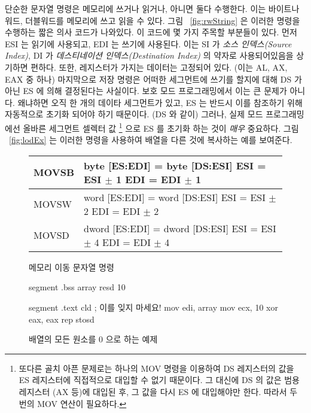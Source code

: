 단순한 문자열 명령은 메모리에 쓰거나 읽거나, 아니면 둘다 수행한다. 이는 
바이트나 워드, 더블워드를 메모리에 쓰고 읽을 수 있다. 그림
~\ref{fig:rwString} 은 이러한 명령을 수행하는 짧은 의사 코드가 나와있다. 
이 코드에 몇 가지 주목할 부분들이 있다. 먼저 ESI 는 읽기에 사용되고, EDI 는
쓰기에 사용된다. 이는 SI 가 \emph{소스 인덱스(Source Index)}, DI 가 \emph{
데스티네이션 인덱스(Destination Index)} 의 약자로 사용되어있음을 상기하면 편하다. 
  또한, 레지스터가 가지는 데이터는
고정되어 있다. (이는 AL, AX, EAX 중 하나) 마지막으로 저장 명령은 어떠한 세그먼트에
쓰기를 할지에 대해 DS 가 아닌 ES 에 의해 결정된다는 사실이다. 보호 모드 프로그래밍에서
이는 큰 문제가 아니다. 왜냐하면 오직 한 개의 데이타 세그먼트가 있고, ES 는 반드시 
이를 참조하기 위해 자동적으로 초기화 되어야 하기 때문이다. (DS 와 같이) 그러나, 
실제 모드 프로그래밍에선 올바른 세그먼트 셀렉터 값
\footnote{또다른 골치 아픈 문제로는 하나의 {\code MOV} 명령을 이용하여
DS 레지스터의 값을 ES 레지스터에 직접적으로 대입할 수 없기 때문이다. 그 대신에
DS 의 값은 범용 레지스터 (AX 등)에 대입된 후, 그 값을 다시 ES 에 대입해야만
한다. 따라서 두 번의 {\code MOV} 연산이 필요하다. }
으로 ES 를 초기화 하는 것이 \emph{매우} 중요하다. 
그림 ~\ref{fig:lodEx} 는 이러한 명령을 사용하여 배열을 다른 것에 복사하는 예를 
보여준다. 

\begin{figure}[t]
\centering
{\code
\begin{tabular}{|lp{2.5in}|}
\hline
MOVSB & byte [ES:EDI] = byte [DS:ESI] \newline ESI = ESI $\pm$ 1 \newline
        EDI = EDI $\pm$ 1 \\
\hline
MOVSW & word [ES:EDI] = word [DS:ESI] \newline ESI = ESI $\pm$ 2 \newline
        EDI = EDI $\pm$ 2 \\
\hline
MOVSD & dword [ES:EDI] = dword [DS:ESI] \newline ESI = ESI $\pm$ 4 \newline
        EDI = EDI $\pm$ 4 \\
\hline
\end{tabular}
}
\caption{메모리 이동 문자열 명령\label{fig:movString} 
          }
\end{figure}

\begin{figure}[t]
\begin{AsmCodeListing}[frame=single]
segment .bss
array  resd 10

segment .text
      cld                   ; 이를 잊지 마세요!
      mov    edi, array
      mov    ecx, 10
      xor    eax, eax
      rep stosd
\end{AsmCodeListing}
\caption{배열의 모든 원소를 0 으로 하는 예제\label{fig:zeroArrayEx}}
\end{figure}

